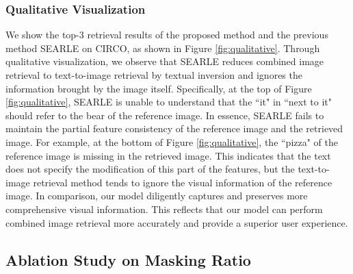 \documentclass[10pt,twocolumn,letterpaper]{article}
\begin{document}
\subsubsection{Qualitative Visualization}
We show the top-3 retrieval results of the proposed method and the previous method SEARLE \cite{Baldrati_2023_ICCV} on CIRCO, as shown in Figure \ref{fig:qualitative}. Through qualitative visualization, we observe that SEARLE reduces combined image retrieval to text-to-image retrieval by textual inversion and ignores the information brought by the image itself. Specifically, at the top of Figure \ref{fig:qualitative}, SEARLE is unable to understand that the ``it" in ``next to it" should refer to the bear of the reference image. In essence, SEARLE fails to maintain the partial feature consistency of the reference image and the retrieved image. For example, at the bottom of Figure \ref{fig:qualitative}, the ``pizza" of the reference image is missing in the retrieved image. This indicates that the text does not specify the modification of this part of the features, but the text-to-image retrieval method tends to ignore the visual information of the reference image. In comparison, our model diligently captures and preserves more comprehensive visual information. This reflects that our model can perform combined image retrieval more accurately and provide a superior user experience.

\subsection{Ablation Study on Masking Ratio}

\begin{table}[!ht]
\centering
  \caption{Ablation study of masking ratio $w$ to our method on the FashionIQ dataset.  The best scores are highlighted in bold.}
  \label{tab:mask ratio}
\end{table}
\end{document}
